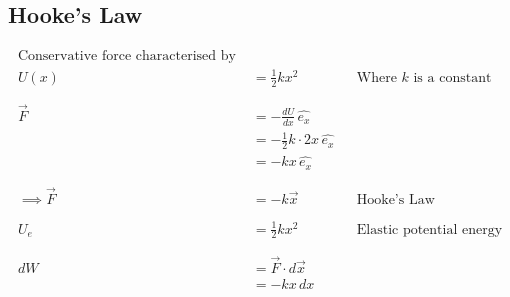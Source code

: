 \documentclass[12pt]{article}
\begin{document}
\subsection{Hooke's Law}
\begin{align*}
	\text{Conservative force characterised by }                                                                             \\
	U(x)                        & = \frac{1}{2} kx^2                             &  & \text{Where } k \text{ is a constant} \\
	\phantom{=}                                                                                                             \\
	\overrightarrow{F}          & = -\frac{dU}{dx} \, \hat{e_x}                                                             \\
	                            & = - \frac{1}{2}k \cdot 2x \, \hat{e_x}                                                    \\
	                            & = -kx \, \hat{e_x}                                                                        \\
	\phantom{=}                                                                                                             \\
	\implies \overrightarrow{F} & = -k\overrightarrow{x}                         &  & \text{Hooke's Law}                    \\
	\phantom{=}                                                                                                             \\
	U_e                         & = \frac{1}{2} kx^2                             &  & \text{Elastic potential energy}       \\
	\phantom{=}                                                                                                             \\
	dW                          & = \overrightarrow{F} \cdot d\overrightarrow{x}                                            \\
	                            & = -kx \, dx
\end{align*}
\end{document}
